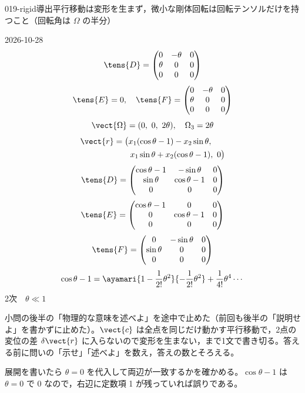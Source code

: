 \documentclass[uplatex,dvipdfmx,a4paper,11pt]{jsarticle}
\begin{document}
\begin{mondai}{019-rigid}{導出}{平行移動は変形を生まず，微小な剛体回転は回転テンソルだけを持つこと（回転角は $\Omega$ の半分）}
\begin{kotaeutsushi}{2026-10-28}
\[ \tens{D}=\begin{pmatrix}0&-\theta&0\\\theta&0&0\\0&0&0\end{pmatrix} \]
\[ \tens{E}=0,\quad \tens{F}=\begin{pmatrix}0&-\theta&0\\\theta&0&0\\0&0&0\end{pmatrix} \]
\[ \vect{\Omega}=(0,\ 0,\ 2\theta),\quad \Omega_{3}=2\theta \]
\begin{align*}
\vect{r}&=\bigl(x_{1}(\cos\theta-1)-x_{2}\sin\theta,\\
&\qquad x_{1}\sin\theta+x_{2}(\cos\theta-1),\ 0\bigr)
\end{align*}
\[ \tens{D}=\begin{pmatrix}\cos\theta-1&-\sin\theta&0\\\sin\theta&\cos\theta-1&0\\0&0&0\end{pmatrix} \]
\[ \tens{E}=\begin{pmatrix}\cos\theta-1&0&0\\0&\cos\theta-1&0\\0&0&0\end{pmatrix} \]
\[ \tens{F}=\begin{pmatrix}0&-\sin\theta&0\\\sin\theta&0&0\\0&0&0\end{pmatrix} \]
\[ \cos\theta-1=\ayamari{1-\frac{1}{2!}\theta^{2}}{-\frac{1}{2!}\theta^{2}}+\frac{1}{4!}\theta^{4}\cdots \]
2次　$\theta\ll1$
\end{kotaeutsushi}
\begin{kizuki}
\item {} 小問の後半の「物理的な意味を述べよ」を途中で止めた（前回も後半の「説明せよ」を書かずに止めた）。$\vect{c}$ は全点を同じだけ動かす平行移動で，2点の変位の差 $\delta\vect{r}$ に入らないので変形を生まない，まで1文で書き切る。答える前に問いの「示せ」「述べよ」を数え，答えの数とそろえる。
\item 展開を書いたら $\theta=0$ を代入して両辺が一致するかを確かめる。$\cos\theta-1$ は $\theta=0$ で 0 なので，右辺に定数項 1 が残っていれば誤りである。
\end{kizuki}

\end{mondai}
\end{document}
